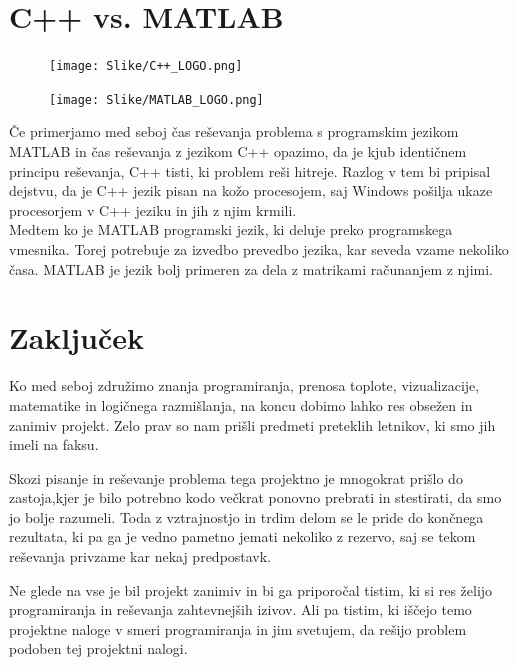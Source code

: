 \documentclass[a4paper,12pt]{article}
\begin{document}
\section{C++ vs. MATLAB}

\begin{figure}[h]
  \centering
  \begin{minipage}{0.3\textwidth}
    \centering
    \texttt{[image: Slike/C++\_LOGO.png]}
  \end{minipage}%
  \hspace{0.05\textwidth}
  \begin{minipage}{0.55\textwidth}
    \centering
    \texttt{[image: Slike/MATLAB\_LOGO.png]}
  \end{minipage}
\end{figure}
Če primerjamo med seboj čas reševanja problema s programskim jezikom MATLAB in čas reševanja z jezikom C++ opazimo, da je kjub identičnem principu reševanja, C++ tisti, ki problem reši hitreje. Razlog v tem bi pripisal dejstvu, da je C++ jezik pisan na kožo procesojem, saj Windows pošilja ukaze procesorjem v C++ jeziku in jih z njim krmili.\\
Medtem ko je MATLAB programski jezik, ki deluje preko programskega vmesnika. Torej potrebuje za izvedbo prevedbo jezika, kar seveda vzame nekoliko časa. MATLAB je jezik bolj primeren za dela z matrikami računanjem z njimi.

\section{Zaključek}

Ko med seboj združimo znanja programiranja, prenosa toplote, vizualizacije, matematike in logičnega razmišlanja, na koncu dobimo lahko res obsežen in zanimiv projekt. Zelo prav so nam prišli predmeti preteklih letnikov, ki smo jih imeli na faksu.

Skozi pisanje in reševanje problema tega projektno je mnogokrat prišlo do zastoja,kjer je bilo potrebno kodo večkrat ponovno prebrati in stestirati, da smo jo bolje razumeli. Toda z vztrajnostjo in trdim delom se le pride do končnega rezultata, ki pa ga je vedno pametno jemati nekoliko z rezervo, saj se tekom reševanja privzame kar nekaj predpostavk.

Ne glede na vse je bil projekt zanimiv in bi ga priporočal tistim, ki si res želijo programiranja in reševanja zahtevnejših izivov. Ali pa tistim, ki iščejo temo projektne naloge v smeri programiranja in jim svetujem, da rešijo problem podoben tej projektni nalogi.
\end{document}

